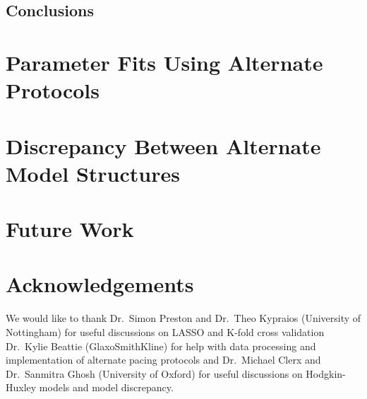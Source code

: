 \documentclass[11pt,a4paper,oneside]{article}
\begin{document}
\subsection{Conclusions}


\section{Parameter Fits Using Alternate Protocols}

\section{Discrepancy Between Alternate Model Structures}

\section{Future Work}

\section{Acknowledgements}
We would like to thank Dr.~Simon Preston and Dr.~Theo Kypraios (University of Nottingham) for useful discussions on LASSO and K-fold cross validation\; Dr.~Kylie Beattie (GlaxoSmithKline) for help with data processing and implementation of alternate pacing protocols\; and Dr.~Michael Clerx and Dr.~Sanmitra Ghosh (University of Oxford) for useful discussions on Hodgkin-Huxley models and model discrepancy.
\end{document}
